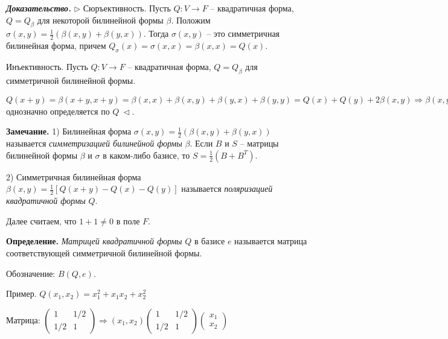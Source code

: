 \vspace{\baselineskip}
\textbf{\textit{Доказательство.}} $\rhd$ Сюръективность. Пусть $Q: V \rightarrow F$ -- квадратичная форма, $Q = Q_\beta$ для некоторой билинейной формы $\beta$. Положим $\sigma(x, y) = \frac{1}{2} (\beta(x,y) + \beta(y,x))$. Тогда $\sigma(x,y)$ -- это симметричная билинейная форма, причем $Q_\sigma (x) = \sigma(x, x) = \beta(x, x) = Q(x)$.

Инъективность. Пусть $Q:V \rightarrow F$ -- квадратичная форма, $Q = Q_\beta$ для симметричной билинейной формы.

$Q(x+y) = \beta(x+y, x+y) = \beta(x,x) + \beta(x,y) + \beta(y,x) + \beta(y,y) = Q(x) + Q(y) + 2\beta(x, y) \Rightarrow \beta(x,y) = \frac{1}{2} \left[ Q(x+y) - Q(x) - Q(y) \right] \Rightarrow \beta$ однозначно определяется по $Q \ \lhd$.

\vspace{\baselineskip}
\textbf{Замечание.} 1) Билинейная форма $\sigma(x,y) = \frac{1}{2} (\beta(x,y) + \beta(y,x))$ называется \textit{симметризацией билинейной формы} $\beta$. Если $B$ и $S$ -- матрицы билинейной формы $\beta$ и $\sigma$ в каком-либо базисе, то $S = \frac{1}{2} (B + B^T)$.

2) Симметричная билинейная форма $\beta(x,y) = \frac{1}{2} \left[ Q(x+y) - Q(x) - Q(y) \right]$ называется \textit{поляризацией квадратичной формы} $Q$. 

\vspace{\baselineskip}
Далее считаем, что $1+1 \neq 0$ в поле $F$.

\vspace{\baselineskip}
\textbf{Определение.} \textit{Матрицей квадратичной формы} $Q$ в базисе $e$ называется матрица соответствующей симметричной билинейной формы.

Обозначение: $B (Q, e)$.

\vspace{\baselineskip}
Пример. $Q(x_1, x_2) = x_1^2 + x_1 x_2 + x_2^2$

Матрица: $\begin{pmatrix} 1 & 1/2 \\ 1/2 & 1 \end{pmatrix} \Rightarrow (x_1, x_2) \begin{pmatrix} 1 & 1/2 \\ 1/2 & 1 \end{pmatrix} \begin{pmatrix} x_1 \\ x_2 \end{pmatrix} $

